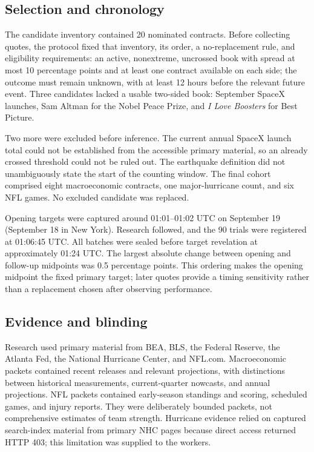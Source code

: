 \documentclass[11pt]{article}
\begin{document}
\subsection{Selection and chronology}
The candidate inventory contained 20 nominated contracts. Before collecting
quotes, the protocol fixed that inventory, its order, a no-replacement rule,
and eligibility requirements: an active, nonextreme, uncrossed book with spread
at most 10 percentage points and at least one contract available on each side;
the outcome must remain unknown, with at least 12 hours before the relevant
future event. Three candidates lacked a usable two-sided book: September SpaceX
launches, Sam Altman for the Nobel Peace Prize, and \emph{I Love Boosters} for
Best Picture.

Two more were excluded before inference. The current annual SpaceX launch total
could not be established from the accessible primary material, so an already
crossed threshold could not be ruled out. The earthquake definition did not
unambiguously state the start of the counting window. The final cohort comprised
eight macroeconomic contracts, one major-hurricane count, and six NFL games.
No excluded candidate was replaced.

Opening targets were captured around 01:01--01:02 UTC on September 19
(September 18 in New York). Research followed, and the 90 trials were registered
at 01:06:45 UTC. All batches were sealed before target revelation at approximately
01:24 UTC. The largest absolute change between opening and follow-up midpoints
was 0.5 percentage points. This ordering makes the opening midpoint the fixed
primary target; later quotes provide a timing sensitivity rather than a
replacement chosen after observing performance.

\subsection{Evidence and blinding}
Research used primary material from BEA, BLS, the Federal Reserve, the Atlanta
Fed, the National Hurricane Center, and NFL.com. Macroeconomic packets contained
recent releases and relevant projections, with distinctions between historical
measurements, current-quarter nowcasts, and annual projections. NFL packets
contained early-season standings and scoring, scheduled games, and injury
reports. They were deliberately bounded packets, not comprehensive estimates
of team strength. Hurricane evidence relied on captured search-index material
from primary NHC pages because direct access returned HTTP 403; this limitation
was supplied to the workers.
\end{document}
